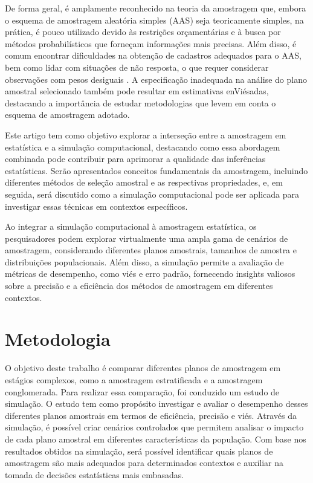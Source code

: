 \documentclass[sn-basic,pdflatex]{sn-jnl}
\theoremstyle{remark}
\theoremstyle{definition}
\begin{document}
De forma geral, é amplamente reconhecido na teoria da amostragem que,
embora o esquema de amostragem aleatória simples (AAS) seja teoricamente
simples, na prática, é pouco utilizado devido às restrições
orçamentárias e à busca por métodos probabilísticos que forneçam
informações mais precisas. Além disso, é comum encontrar dificuldades na
obtenção de cadastros adequados para o AAS, bem como lidar com situações
de não resposta, o que requer considerar observações com pesos desiguais
\citep{skinner2005design}. A especificação inadequada na análise do
plano amostral selecionado também pode resultar em estimativas
enViésadas, destacando a importância de estudar metodologias que levem
em conta o esquema de amostragem adotado.

Este artigo tem como objetivo explorar a interseção entre a amostragem
em estatística e a simulação computacional, destacando como essa
abordagem combinada pode contribuir para aprimorar a qualidade das
inferências estatísticas. Serão apresentados conceitos fundamentais da
amostragem, incluindo diferentes métodos de seleção amostral e as
respectivas propriedades, e, em seguida, será discutido como a simulação
computacional pode ser aplicada para investigar essas técnicas em
contextos específicos.

Ao integrar a simulação computacional à amostragem estatística, os
pesquisadores podem explorar virtualmente uma ampla gama de cenários de
amostragem, considerando diferentes planos amostrais, tamanhos de
amostra e distribuições populacionais. Além disso, a simulação permite a
avaliação de métricas de desempenho, como viés e erro padrão, fornecendo
insights valiosos sobre a precisão e a eficiência dos métodos de
amostragem em diferentes contextos.

\hypertarget{metodologia}{%
\section{Metodologia}\label{metodologia}}

O objetivo deste trabalho é comparar diferentes planos de amostragem em
estágios complexos, como a amostragem estratificada e a amostragem
conglomerada. Para realizar essa comparação, foi conduzido um estudo de
simulação. O estudo tem como propósito investigar e avaliar o desempenho
desses diferentes planos amostrais em termos de eficiência, precisão e
viés. Através da simulação, é possível criar cenários controlados que
permitem analisar o impacto de cada plano amostral em diferentes
características da população. Com base nos resultados obtidos na
simulação, será possível identificar quais planos de amostragem são mais
adequados para determinados contextos e auxiliar na tomada de decisões
estatísticas mais embasadas.
\end{document}
